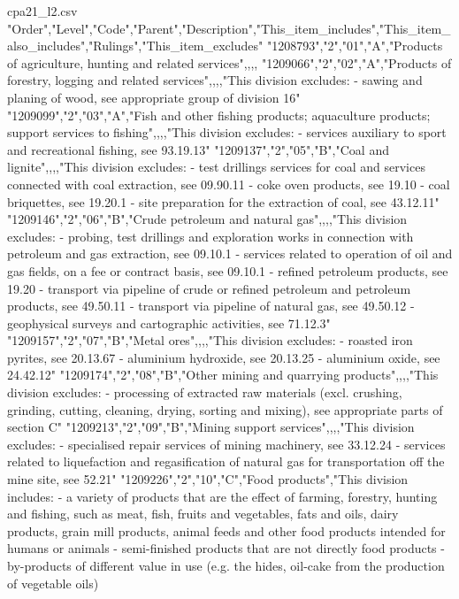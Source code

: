 \begin{filecontents*}{cpa21_l2.csv}
"Order","Level","Code","Parent","Description","This_item_includes","This_item_also_includes","Rulings","This_item_excludes"
"1208793","2","01","A","Products of agriculture, hunting and related services",,,,
"1209066","2","02","A","Products of forestry, logging and related services",,,,"This division excludes:
- 	sawing and planing of wood, see appropriate group of division 16"
"1209099","2","03","A","Fish and other fishing products; aquaculture products; support services to fishing",,,,"This division excludes:
- services auxiliary to sport and recreational fishing, see 93.19.13"
"1209137","2","05","B","Coal and lignite",,,,"This division excludes:
- 	test drillings services for coal and services connected with coal extraction, see 09.90.11
- coke oven products, see 19.10
- coal briquettes, see 19.20.1
- site preparation for the extraction of coal, see 43.12.11"
"1209146","2","06","B","Crude petroleum and natural gas",,,,"This division excludes:
- 	probing, test drillings and exploration works in connection with petroleum and gas extraction, see 09.10.1
- services related to operation of oil and gas fields, on a fee or contract basis, see 09.10.1
- 	refined petroleum products, see 19.20
- transport via pipeline of crude or refined petroleum and petroleum products, see 49.50.11
- transport via pipeline of natural gas, see 49.50.12
- 	geophysical surveys and cartographic activities, see 71.12.3"
"1209157","2","07","B","Metal ores",,,,"This division excludes:
- roasted iron pyrites, see 20.13.67
- aluminium hydroxide, see 20.13.25 
- aluminium oxide, see 24.42.12"
"1209174","2","08","B","Other mining and quarrying products",,,,"This division excludes:
- processing of extracted raw materials (excl. crushing, grinding, cutting, cleaning, drying, sorting and mixing), see appropriate parts of section C"
"1209213","2","09","B","Mining support services",,,,"This division excludes: 
- specialised repair services of mining machinery, see 33.12.24
- services related to liquefaction and regasification of natural gas for transportation off the mine site, see 52.21"
"1209226","2","10","C","Food products","This division includes: 
- a variety of products that are the effect of farming, forestry, hunting and fishing, such as meat, fish, fruits and vegetables, fats and oils, dairy products, grain mill products, animal feeds and other food products intended for humans or animals
- semi-finished products that are not directly food products 
- by-products of different value in use (e.g. the hides, oil-cake from the production of vegetable oils)

\end{filecontents*}
